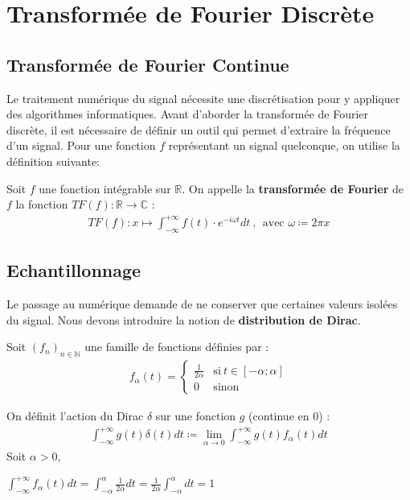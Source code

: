 \section{Transformée de Fourier Discrète}

\subsection{Transformée de Fourier Continue}

Le traitement numérique du signal nécessite une discrétisation pour y appliquer des algorithmes informatiques. Avant d'aborder la transformée de Fourier discrète, il est nécessaire de définir un outil qui permet d'extraire la fréquence d'un signal. Pour une fonction $f$ représentant un signal quelconque, on utilise la définition suivante:


Soit $f$ une fonction intégrable sur $\mathbb{R}$. On appelle la \textbf{transformée de Fourier} de $f$ la fonction $TF(f): \mathbb{R} \rightarrow \mathbb{C}$ : \\
\begin{align*}
    TF(f) : x \mapsto \int_{-\infty}^{+\infty} f(t) \cdot e^{-i\omega t}dt \ ,\ \ \text{avec } \omega \coloneq 2 \pi x 
\end{align*}


\subsection{Echantillonnage}

Le passage au numérique demande de ne conserver que certaines valeurs isolées du signal.
Nous devons introduire la notion de \textbf{distribution de Dirac}.

Soit $(f_n)_{n \in \mathbb{N}}$ une famille de fonctions définies par :
\begin{align*}
    f_\alpha(t) = \left\{ \begin{array}{cl} \frac{1}{2\alpha} & \text{si} \ t \in [-\alpha;\alpha] \\ 0 &  \text{sinon}
\end{array} \right.
\end{align*}



On définit l'action du Dirac $\delta$ sur une fonction $g$ (continue en $0$) :
\begin{align*}
    \int_{-\infty}^{+\infty}g(t)\delta(t)dt \coloneqq \lim_{\alpha \to 0}  \int_{-\infty}^{+\infty}g(t)f_\alpha(t)dt
\end{align*}
Soit $\alpha > 0,$
\begin{center}
    $\int_{-\infty}^{+\infty}f_\alpha(t)dt = \int_{-\alpha}^{\alpha}\frac{1}{2\alpha}dt = \frac{1}{2\alpha}\int_{-\alpha}^{\alpha}dt = 1$
\end{center}

